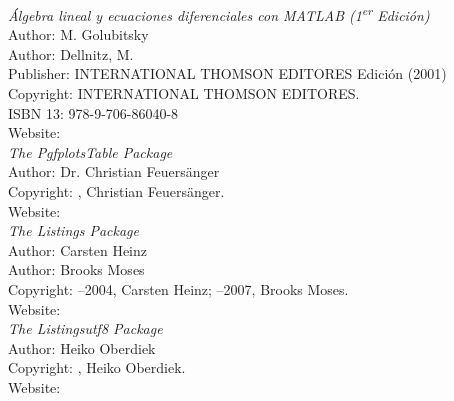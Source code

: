 
\begin{thebibliography}{4}


\emph{Álgebra lineal y ecuaciones diferenciales con MATLAB (1\textsuperscript{er} Edición)}\\
Author: M. Golubitsky\\
Author: Dellnitz, M.\\
Publisher:  INTERNATIONAL THOMSON EDITORES Edición (2001)\\
Copyright: \textcopyright {} INTERNATIONAL THOMSON EDITORES.\\
ISBN 13: 978-9-706-86040-8\\
Website: \\


\emph{The PgfplotsTable Package}\\
Author: Dr. Christian Feuersänger\\
Copyright: \textcopyright{}, Christian Feuersänger.\\
Website: \\


\emph{The Listings Package}\\
Author: Carsten Heinz\\
Author: Brooks Moses\\
Copyright: \textcopyright{}–2004, Carsten Heinz; \textcopyright{}–2007, Brooks Moses.\\
Website: \\


\emph{The Listingsutf8 Package}\\
Author: Heiko Oberdiek\\
Copyright: \textcopyright{}, Heiko Oberdiek.\\
Website: \\





\end{thebibliography}